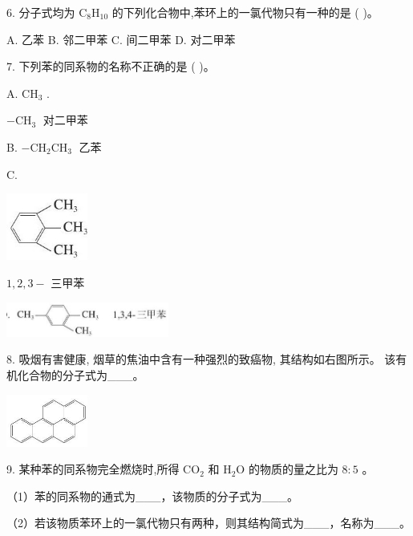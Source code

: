 \documentclass[10pt]{article}
\begin{document}
6. 分子式均为 \({\mathrm{C}}_{8}{\mathrm{H}}_{10}\) 的下列化合物中,苯环上的一氯代物只有一种的是 ( )。

A. 乙苯 B. 邻二甲苯 C. 间二甲苯 D. 对二甲苯

7. 下列苯的同系物的名称不正确的是 ( )。

A. \({\mathrm{{CH}}}_{3}\) .

\(- {\mathrm{{CH}}}_{3}\;\) 对二甲苯

B. \(- {\mathrm{{CH}}}_{2}{\mathrm{{CH}}}_{3}\;\) 乙苯

C.

\begin{center}
\includegraphics[max width=0.2\textwidth]{images/0190efc5-b58a-7c43-bfb0-e0a030df9cfd_54_639309.jpg}
\end{center}

\(1,2,3 -\) 三甲苯

\begin{center}
\includegraphics[max width=0.4\textwidth]{images/0190efc5-b58a-7c43-bfb0-e0a030df9cfd_54_318973.jpg}
\end{center}

8. 吸烟有害健康, 烟草的焦油中含有一种强烈的致癌物, 其结构如右图所示。 该有机化合物的分子式为\_\_\_。

\begin{center}
\includegraphics[max width=0.2\textwidth]{images/0190efc5-b58a-7c43-bfb0-e0a030df9cfd_54_535041.jpg}
\end{center}

9. 某种苯的同系物完全燃烧时,所得 \({\mathrm{{CO}}}_{2}\) 和 \({\mathrm{H}}_{2}\mathrm{O}\) 的物质的量之比为 \(8 : 5\) 。

（1）苯的同系物的通式为\_\_\_，该物质的分子式为\_\_\_。

（2）若该物质苯环上的一氯代物只有两种，则其结构简式为\_\_\_，名称为\_\_\_。
\end{document}
